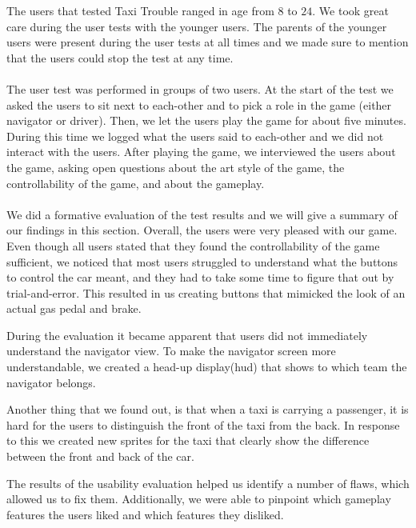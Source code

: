 The users that tested Taxi Trouble ranged in age from $8$ to $24$. We took great care during the user tests with the younger users. The parents of the younger users were present during the user tests at all times and we made sure to mention that the users could stop the test at any time.
\\\\
The user test was performed in groups of two users. At the start of the test we asked the users to sit next to each-other and to pick a role in the game (either navigator or driver). Then, we let the users play the game for about five minutes. During this time we logged what the users said to each-other and we did not interact with the users. After playing the game, we interviewed the users about the game, asking open questions about the art style of the game, the controllability of the game, and about the gameplay.
\\\\
We did a formative evaluation of the test results and we will give a summary of our findings in this section. Overall, the users were very pleased with our game. Even though all users stated that they found the controllability of the game sufficient, we noticed that most users struggled to understand what the buttons to control the car meant, and they had to take some time to figure that out by trial-and-error. This resulted in us creating buttons that mimicked the look of an actual gas pedal and brake.

During the evaluation it became apparent that users did not immediately understand the navigator view. To make the navigator screen more understandable, we created a head-up display(hud) that shows to which team the navigator belongs.

Another thing that we found out, is that when a taxi is carrying a passenger, it is hard for the users to distinguish the front of the taxi from the back. In response to this we created new sprites for the taxi that clearly show the difference between the front and back of the car.

The results of the usability evaluation helped us identify a number of flaws, which allowed us to fix them. Additionally, we were able to pinpoint which gameplay features the users liked and which features they disliked.